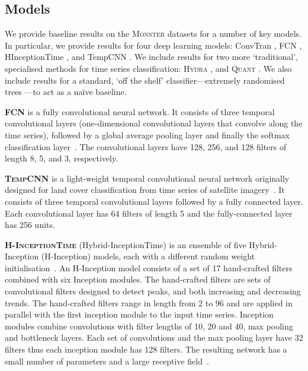 \documentclass[twoside,11pt,preprint]{article}
\newcommand{\monster}{\textsc{Monster}}
\newcommand{\fcn}{\textsc{FCN}}
\newcommand{\hinception}{\textsc{H-InceptionTime}}
\newcommand{\tempcnn}{\textsc{TempCNN}}
\newcommand{\quant}{\textsc{Quant}}
\newcommand{\hydra}{\textsc{Hydra}}
\begin{document}
\subsection{Models}

We provide baseline results on the {\monster} datasets for a number of key models. In particular, we provide results for four deep learning models: ConvTran \citep{ConvTran}, FCN \citep{Wang2017}, HInceptionTime \citep{Ismail-fawaz2022}, and TempCNN \citep{Pelletier2019}. We include results for two more `traditional', specialised methods for time series classification: {\hydra} \citep{dempster_etal_2023}, and {\quant} \citep{dempster_etal_2024b}. We also include results for a standard, `off the shelf' classifier---extremely randomised trees \citep{geurts_etal_2006}---to act as a na\"{i}ve baseline.

\textbf{{\fcn}} is a fully convolutional neural network. It consists of three temporal convolutional layers (one-dimensional convolutional layers that convolve along the time series), followed by a global average pooling layer and finally the softmax classification layer~\citep{Wang2017}. The convolutional layers have 128, 256, and 128 filters of length 8, 5, and 3, respectively.

\textbf{{\tempcnn}} is a light-weight temporal convolutional neural network originally designed for land cover classification from time series of satellite imagery~\citep{Pelletier2019}. It consists of three temporal convolutional layers followed by a fully connected layer. Each convolutional layer has 64 filters of length 5 and the fully-connected layer has 256 units. 

\textbf{{\hinception}} (Hybrid-InceptionTime) is an ensemble of five Hybrid-Inception (H-Inception) models, each with a different random weight initialisation~\citep{Ismail-fawaz2022}. An H-Inception model consists of a set of 17 hand-crafted filters combined with six Inception modules. The hand-crafted filters are sets of convolutional filters designed to detect peaks, and both increasing and decreasing trends. The hand-crafted filters range in length from 2 to 96 and are applied in parallel with the first inception module to the input time series. Inception modules combine convolutions with filter lengths of 10, 20 and 40, max pooling and bottleneck layers. Each set of convolutions and the max pooling layer have 32 filters thus each inception module has 128 filters. The resulting network has a small number of parameters and a large receptive field~\citep{Fawaz2019a}.
\end{document}
